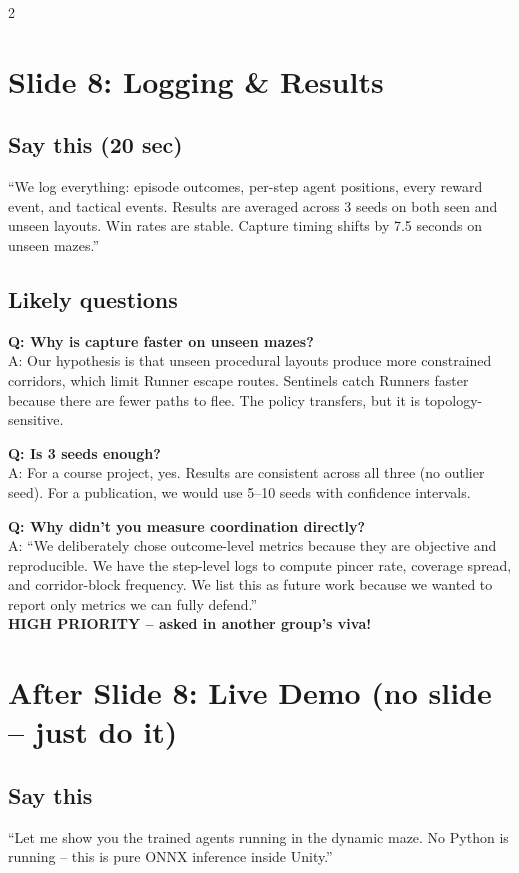 \documentclass[9pt,a4paper]{article}
\begin{document}
\begin{multicols}{2}
\section{Slide 8: Logging \& Results}

\subsection{Say this (20 sec)}
``We log everything: episode outcomes, per-step agent positions, every reward event, and tactical events. Results are averaged across 3 seeds on both seen and unseen layouts. Win rates are stable. Capture timing shifts by 7.5 seconds on unseen mazes.''

\subsection{Likely questions}
\textbf{Q: Why is capture faster on unseen mazes?} \\
A: Our hypothesis is that unseen procedural layouts produce more constrained corridors, which limit Runner escape routes. Sentinels catch Runners faster because there are fewer paths to flee. The policy transfers, but it is topology-sensitive.

\textbf{Q: Is 3 seeds enough?} \\
A: For a course project, yes. Results are consistent across all three (no outlier seed). For a publication, we would use 5--10 seeds with confidence intervals.

\textbf{Q: Why didn't you measure coordination directly?} \\
A: ``We deliberately chose outcome-level metrics because they are objective and reproducible. We have the step-level logs to compute pincer rate, coverage spread, and corridor-block frequency. We list this as future work because we wanted to report only metrics we can fully defend.'' \\
{\scriptsize\color{gray}\textbf{HIGH PRIORITY -- asked in another group's viva!}}

\section{After Slide 8: Live Demo (no slide -- just do it)}

\subsection{Say this}
``Let me show you the trained agents running in the dynamic maze. No Python is running -- this is pure ONNX inference inside Unity.''


\end{multicols}
\end{document}
